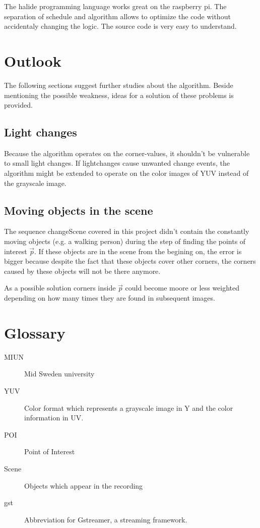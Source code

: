 The halide programming language works great on the raspberry pi. The separation of schedule and algorithm allows to optimize the code without accidentaly changing the logic. The source code is very easy to understand. 

\chapter{Outlook}
The following sections suggest further studies about the algorithm. Beside mentioning the possible weakness, ideas for a solution of these problems is provided. 

\section{Light changes}
Because the algorithm operates on the corner-values, it shouldn't be vulnerable to small light changes. If lightchanges cause unwanted change events, the algorithm might be extended to operate on the color images of YUV instead of the grayscale image. 

\section{Moving objects in the scene}
The sequence changeScene covered in this project didn't contain the constantly moving objects (e.g. a walking person)  during the step of finding the points of interest $\vec{p} $. If these objects are in the scene from the begining on, the error is bigger because despite the fact that these objects cover other corners, the corners caused by these objects  will not be there anymore.

As a possible solution corners inside $\vec{p} $ could become moore or less weighted depending on how many times they are found in subsequent images.
\chapter{Glossary}
\begin{description}
	\item[MIUN] Mid Sweden university
	\item[YUV] Color format which represents a grayscale image in Y and the color information in UV.
	\item[POI] Point of Interest
	\item[Scene] Objects which appear in the recording
	\item[gst] 	Abbreviation for Gstreamer, a streaming framework.
\end{description}
